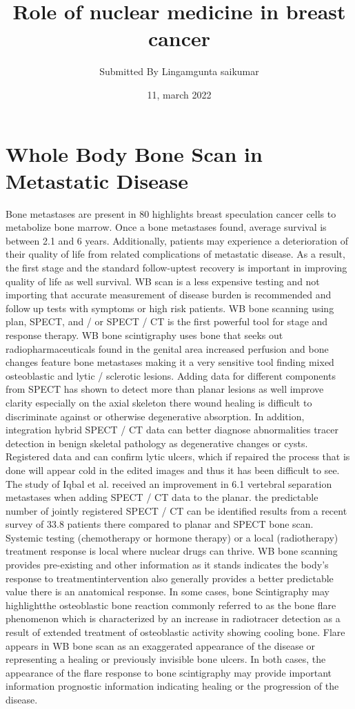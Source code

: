 \documentclass{article}
\title{Role of nuclear medicine in breast cancer}
\author{Submitted By Lingamgunta saikumar}
\date{11, march 2022}
\begin{document}
\maketitle

\section{Whole Body Bone Scan in Metastatic Disease }
Bone metastases are present in 80%
highlights breast speculation cancer cells to metabolize bone marrow. Once a 
bone metastases found, average survival is between 2.1 and 6 years. 
Additionally, patients may experience a deterioration of their quality of life 
from related complications of metastatic disease. As a result, the first stage 
and the standard follow-uptest recovery is important in improving quality of 
life as well survival. WB scan is a less expensive testing and not importing 
that accurate measurement of disease burden is recommended and followup tests with symptoms or high risk patients.
WB bone scanning using plan, SPECT, and / or SPECT / CT is the first powerful 
tool for stage and response therapy. WB bone scintigraphy uses bone that 
seeks out radiopharmaceuticals found in the genital area increased perfusion 
and bone changes feature bone metastases making it a very sensitive tool 
finding mixed osteoblastic and lytic / sclerotic lesions. Adding data for 
different components from SPECT has shown to detect more than planar 
lesions as well improve clarity especially on the axial skeleton there wound 
healing is difficult to discriminate against or otherwise degenerative 
absorption. In addition, integration hybrid SPECT / CT data can better 
diagnose abnormalities tracer detection in benign skeletal pathology as 
degenerative changes or cysts. Registered data and can confirm lytic ulcers, 
which if repaired the process that is done will appear cold in the edited 
images and thus it has been difficult to see. The study of Iqbal et al. received 
an improvement in 6.1%
vertebral separation metastases when adding SPECT / CT data to the planar.
the predictable number of jointly registered SPECT / CT can be identified 
results from a recent survey of 33.8%
patients there compared to planar and SPECT bone scan. Systemic testing 
(chemotherapy or hormone therapy) or a local (radiotherapy) treatment 
response is local where nuclear drugs can thrive. WB bone scanning provides 
pre-existing and other information as it stands indicates the body's response 
to treatmentintervention also generally provides a better predictable value
there is an anatomical response. In some cases, bone Scintigraphy may 
highlightthe osteoblastic bone reaction commonly referred to as the bone 
flare phenomenon which is characterized by an increase in radiotracer 
detection as a result of extended treatment of osteoblastic activity showing 
cooling bone. Flare appears in WB bone scan as an exaggerated appearance 
of the disease or representing a healing or previously invisible bone ulcers. In
both cases, the appearance of the flare response to bone scintigraphy may 
provide important information prognostic information indicating healing or 
the progression of the disease.
\end{document}
